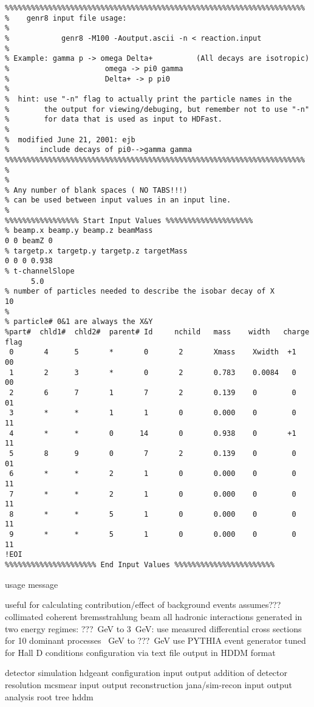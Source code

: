 \begin{verbatim}
%%%%%%%%%%%%%%%%%%%%%%%%%%%%%%%%%%%%%%%%%%%%%%%%%%%%%%%%%%%%%%%%%%%%%
%    genr8 input file usage: 
%
%            genr8 -M100 -Aoutput.ascii -n < reaction.input
%
% Example: gamma p -> omega Delta+          (All decays are isotropic)
%                      omega -> pi0 gamma
%                      Delta+ -> p pi0
%
%  hint: use "-n" flag to actually print the particle names in the
%        the output for viewing/debuging, but remember not to use "-n" 
%        for data that is used as input to HDFast.
%
%  modified June 21, 2001: ejb
%       include decays of pi0-->gamma gamma
%%%%%%%%%%%%%%%%%%%%%%%%%%%%%%%%%%%%%%%%%%%%%%%%%%%%%%%%%%%%%%%%%%%%%
%
%
% Any number of blank spaces ( NO TABS!!!) 
% can be used between input values in an input line.
%
%%%%%%%%%%%%%%%%% Start Input Values %%%%%%%%%%%%%%%%%%%%
% beamp.x beamp.y beamp.z beamMass  
0 0 beamZ 0
% targetp.x targetp.y targetp.z targetMass
0 0 0 0.938
% t-channelSlope
      5.0
% number of particles needed to describe the isobar decay of X
10
%   
% particle# 0&1 are always the X&Y 
%part#  chld1#  chld2#  parent# Id     nchild   mass    width   charge  flag
 0       4      5       *       0       2       Xmass    Xwidth  +1     00  
 1       2      3       *       0       2       0.783    0.0084   0     00
 2       6      7       1       7       2       0.139    0        0     01
 3       *      *       1       1       0       0.000    0        0     11
 4       *      *       0      14       0       0.938    0       +1     11
 5       8      9       0       7       2       0.139    0        0     01
 6       *      *       2       1       0       0.000    0        0     11
 7       *      *       2       1       0       0.000    0        0     11
 8       *      *       5       1       0       0.000    0        0     11
 9       *      *       5       1       0       0.000    0        0     11
!EOI
%%%%%%%%%%%%%%%%%%%%% End Input Values %%%%%%%%%%%%%%%%%%%%%%%
\end{verbatim}


\I usage message


\I useful for calculating contribution/effect of background events
\I assumes??? collimated coherent bremsstrahlung beam
\I all hadronic interactions generated in two energy regimes:
  \I ???~GeV to 3~GeV: use measured differential cross sections for 10 dominant processes
  ~GeV to ???~GeV use PYTHIA event generator tuned for Hall D conditions
\I configuration via text file
\I output in HDDM format

detector simulation
  hdgeant
    configuration
    input
    output
addition of detector resolution
  mcsmear
    input
    output
reconstruction
  jana/sim-recon
    input
    output 
analysis
  root tree
hddm
